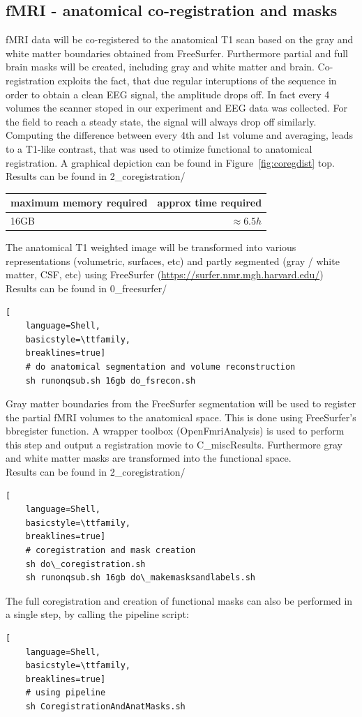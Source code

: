 \documentclass[12pt,a4paper]{scrartcl}
\begin{document}
\subsection{fMRI - anatomical co-registration and masks}
fMRI data will be co-registered to the anatomical T1 scan based on the gray and white matter boundaries obtained from FreeSurfer. Furthermore partial and full brain masks will be created, including gray and white matter and brain. Co-registration exploits the fact, that due regular interuptions of the sequence in order to obtain a clean EEG signal, the amplitude drops off. In fact every 4 volumes the scanner stoped in our experiment and EEG data was collected. For the field to reach a steady state, the signal will always drop off similarly.\\
\noindent Computing the difference between every 4th and 1st volume and averaging, leads to a T1-like contrast, that was used to otimize functional to anatomical registration. A graphical depiction can be found in Figure~\ref{fig:coregdist} top.\\
Results can be found in 2\_coregistration/
\begin{table}[h]
\begin{tabular}{l | r}
\toprule
maximum memory required & approx time required\\\toprule
16GB & $\approx 6.5h$ \\\bottomrule
\end{tabular}
\end{table}
The anatomical T1 weighted image will be transformed into various representations (volumetric, surfaces, etc) and partly segmented (gray / white matter, CSF, etc) using FreeSurfer (\href{https://surfer.nmr.mgh.harvard.edu/}{https://surfer.nmr.mgh.harvard.edu/})\\
Results can be found in 0\_freesurfer/
\begin{lstlisting}[
    language=Shell,
    basicstyle=\ttfamily,
    breaklines=true]
    # do anatomical segmentation and volume reconstruction
    sh runonqsub.sh 16gb do_fsrecon.sh
\end{lstlisting}
Gray matter boundaries from the FreeSurfer segmentation will be used to register the partial fMRI volumes to the anatomical space. This is done using FreeSurfer's bbregister function. A wrapper toolbox (OpenFmriAnalysis) is used to perform this step and output a registration movie to C\_miscResults. Furthermore gray and white matter masks are transformed into the functional space.\\
Results can be found in 2\_coregistration/
\begin{lstlisting}[
    language=Shell,
    basicstyle=\ttfamily,
    breaklines=true]
    # coregistration and mask creation
    sh do\_coregistration.sh
    sh runonqsub.sh 16gb do\_makemasksandlabels.sh
\end{lstlisting}
The full coregistration and creation of functional masks can also be performed in a single step, by calling the pipeline script:
\begin{lstlisting}[
    language=Shell,
    basicstyle=\ttfamily,
    breaklines=true]
    # using pipeline
    sh CoregistrationAndAnatMasks.sh
\end{lstlisting}
\end{document}

